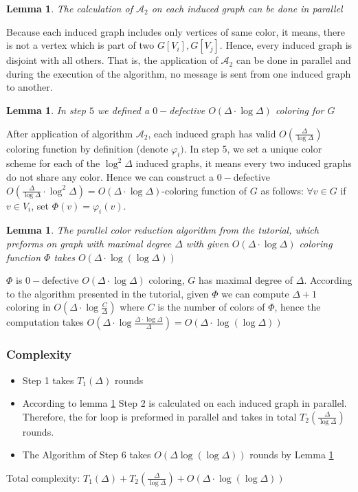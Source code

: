 \documentclass[11pt]{article}
\newtheorem{lemma}[theorem]{Lemma}
\begin{document}
\begin{lemma}
\label{A_2_parallel}
The calculation of $\mathcal{A}_2$ on each induced graph can be done in parallel
\end{lemma}
Because each induced graph includes only vertices of same color, it means, there is not a vertex which is part of two $G[V_i], G[V_j]$. Hence, every induced graph is disjoint with all others. That is, the application of $\mathcal{A}_2$ can be done in parallel and during the execution of the algorithm, no message is sent from one induced graph to another.

\begin{lemma}
In step $5$ we defined a $0-$defective $O(\Delta \cdot \log{\Delta})$ coloring for $G$
\end{lemma}
After application of algorithm $\mathcal{A}_2$, each induced graph has valid $O(\frac{\Delta}{\log{\Delta}})$ coloring function by definition (denote $\varphi_i)$. In step 5, we set a unique color scheme for each of the $\log^2{\Delta}$ induced graphs, it means every two induced graphs do not share any color. Hence we can construct a  $0-$defective $O(\frac{\Delta}{\log{\Delta}}  \cdot  \log^2{\Delta})
=O(\Delta  \cdot  \log{\Delta})$-coloring function of $G$ as follows: $\forall v \in G$ if $v \in V_i$, set $\Phi(v) = \varphi_i(v)$. 
\begin{lemma}
\label{parallel_reduction_tutorial}
The parallel color reduction algorithm from the tutorial, which preforms on graph with maximal degree $\Delta$ with given $O(\Delta  \cdot  \log{\Delta})$ coloring function $\Phi$ takes $O(\Delta  \cdot  \log({\log{\Delta}}))$
\end{lemma}
$\Phi$ is $0-$defective $O(\Delta \cdot \log{\Delta})$ coloring, $G$ has maximal degree of $\Delta$. According to the algorithm presented in the tutorial, given $\Phi$ we can compute $\Delta+1$ coloring in 
$O(\Delta  \cdot  \log{\frac{C}{\Delta}})$ where $C$ is the number of colors of $\Phi$, hence the computation takes $O(\Delta  \cdot  \log{\frac{\Delta \cdot \log{\Delta}}{\Delta}})=O(\Delta  \cdot  \log({\log{\Delta}}))
$


\subsubsection*{Complexity}
\begin{itemize}
    \item Step 1 takes $T_1(\Delta)$ rounds
    \item According to lemma \ref{A_2_parallel} Step 2 is calculated on each induced graph in parallel. Therefore, the for loop is preformed in parallel and takes in total $T_2(\frac{\Delta}{\log{\Delta}})$ rounds. 
    \item The Algorithm of Step 6 takes $O(\Delta\log(\log{{\Delta}}))$ rounds by Lemma \ref{parallel_reduction_tutorial}
\end{itemize}

Total complexity: $T_1(\Delta) + T_2(\frac{\Delta}{\log{\Delta}}) + O(\Delta  \cdot  \log({\log{\Delta}}))$ 
\end{document}
